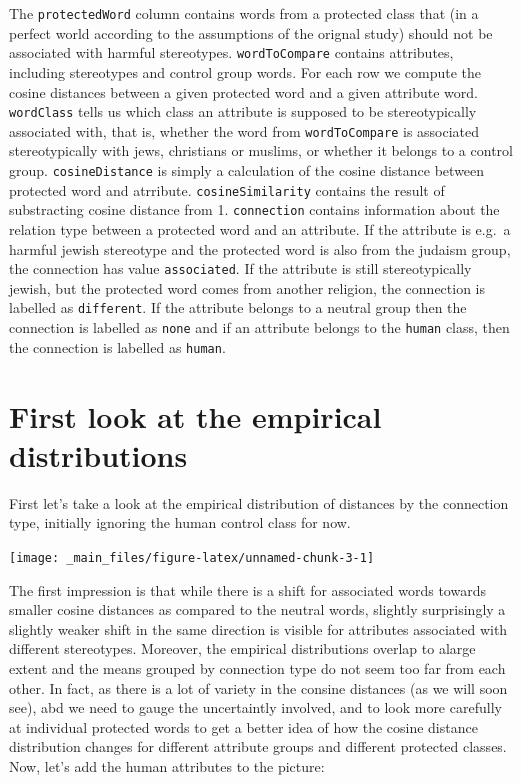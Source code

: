 \documentclass[
  12pt,
]{book}
\begin{document}
The \texttt{protectedWord} column contains words from a protected class that (in a perfect world according to the assumptions of the orignal study) should not be associated with harmful stereotypes. \texttt{wordToCompare} contains attributes, including stereotypes and control group words. For each row we compute the cosine distances between a given protected word and a given attribute word. \texttt{wordClass} tells us which class an attribute is supposed to be stereotypically associated with, that is, whether the word from \texttt{wordToCompare} is associated stereotypically with jews, christians or muslims, or whether it belongs to a control group. \texttt{cosineDistance} is simply a calculation of the cosine distance between protected word and atrribute. \texttt{cosineSimilarity} contains the result of substracting cosine distance from 1. \texttt{connection} contains information about the relation type between a protected word and an attribute. If the attribute is e.g.~a harmful jewish stereotype and the protected word is also from the judaism group, the connection has value \texttt{associated}. If the attribute is still stereotypically jewish, but the protected word comes from another religion, the connection is labelled as \texttt{different}. If the attribute belongs to a neutral group then the connection is labelled as \texttt{none} and if an attribute belongs to the \texttt{human} class, then the connection is labelled as \texttt{human}.

\hypertarget{first-look-at-the-empirical-distributions}{%
\section{First look at the empirical distributions}\label{first-look-at-the-empirical-distributions}}

First let's take a look at the empirical distribution of distances by the connection type, initially ignoring the human control class for now.

\vspace{1mm}
\footnotesize

\begin{center}\texttt{[image: \_main\_files/figure-latex/unnamed-chunk-3-1]} \end{center}
\normalsize

The first impression is that while there is a shift for associated words towards smaller cosine distances as compared to the neutral words, slightly surprisingly a slightly weaker shift in the same direction is visible for attributes associated with different stereotypes. Moreover, the empirical distributions overlap to alarge extent and the means grouped by connection type do not seem too far from each other. In fact, as there is a lot of variety in the consine distances (as we will soon see), abd we need to gauge the uncertaintly involved, and to look more carefully at individual protected words to get a better idea of how the cosine distance distribution changes for different attribute groups and different protected classes. Now, let's add the human attributes to the picture:
\end{document}
